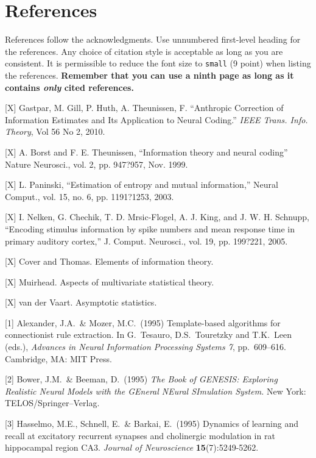 \documentclass{article}
\begin{document}
\section*{References}

References follow the acknowledgments. Use unnumbered first-level
heading for the references. Any choice of citation style is acceptable
as long as you are consistent. It is permissible to reduce the font
size to \verb+small+ (9 point) when listing the references. {\bf
  Remember that you can use a ninth page as long as it contains
  \emph{only} cited references.}
\medskip

\small

[X] Gastpar, M.  Gill, P.  Huth, A.  Theunissen, F. ``Anthropic Correction of Information Estimates and Its Application to Neural Coding.'' \emph{IEEE Trans. Info. Theory}, Vol 56 No 2, 2010.

[X] A. Borst and F. E. Theunissen, ``Information theory and neural coding''
Nature Neurosci., vol. 2, pp. 947?957, Nov. 1999.

[X] L. Paninski, ``Estimation of entropy and mutual information,'' Neural
Comput., vol. 15, no. 6, pp. 1191?1253, 2003.

[X] I. Nelken, G. Chechik, T. D. Mrsic-Flogel, A. J. King, and J. W. H.
Schnupp, ``Encoding stimulus information by spike numbers and mean
response time in primary auditory cortex,'' J. Comput. Neurosci., vol.
19, pp. 199?221, 2005.

[X] Cover and Thomas.  Elements of information theory.

[X]  Muirhead.  Aspects of multivariate statistical theory.

[X] van der Vaart.  Asymptotic statistics.

[1] Alexander, J.A.\ \& Mozer, M.C.\ (1995) Template-based algorithms
for connectionist rule extraction. In G.\ Tesauro, D.S.\ Touretzky and
T.K.\ Leen (eds.), {\it Advances in Neural Information Processing
  Systems 7}, pp.\ 609--616. Cambridge, MA: MIT Press.

[2] Bower, J.M.\ \& Beeman, D.\ (1995) {\it The Book of GENESIS:
  Exploring Realistic Neural Models with the GEneral NEural SImulation
  System.}  New York: TELOS/Springer--Verlag.

[3] Hasselmo, M.E., Schnell, E.\ \& Barkai, E.\ (1995) Dynamics of
learning and recall at excitatory recurrent synapses and cholinergic
modulation in rat hippocampal region CA3. {\it Journal of
  Neuroscience} {\bf 15}(7):5249-5262.
\end{document}
